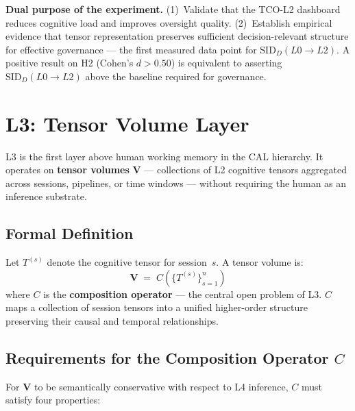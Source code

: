 \documentclass[11pt]{article}
\theoremstyle{definition}
\theoremstyle{remark}
\begin{document}
\medskip
\noindent\textbf{Dual purpose of the experiment.} (1)~Validate that
the TCO-L2 dashboard reduces cognitive load and improves oversight
quality. (2)~Establish empirical evidence that tensor representation
preserves sufficient decision-relevant structure for effective
governance --- the first measured data point for $\text{SID}_D(L0 \to
L2)$. A positive result on H2 (Cohen's $d > 0.50$) is equivalent to
asserting $\text{SID}_D(L0 \to L2)$ above the baseline required for
governance.

\section{L3: Tensor Volume Layer}

L3 is the first layer above human working memory in the CAL
hierarchy. It operates on \textbf{tensor volumes}
$\mathbf{V}$ --- collections of L2 cognitive tensors aggregated
across sessions, pipelines, or time windows --- without requiring the
human as an inference substrate.

\subsection{Formal Definition}

Let $T^{(s)}$ denote the cognitive tensor for session~$s$. A tensor
volume is:
\[
  \mathbf{V} \;=\; C\!\left(\{T^{(s)}\}_{s=1}^{n}\right)
\]
where $C$ is the \textbf{composition operator} --- the central open
problem of L3. $C$ maps a collection of session tensors into a
unified higher-order structure preserving their causal and temporal
relationships.

\subsection{Requirements for the Composition Operator $C$}

For $\mathbf{V}$ to be semantically conservative with respect to L4
inference, $C$ must satisfy four properties:
\end{document}
